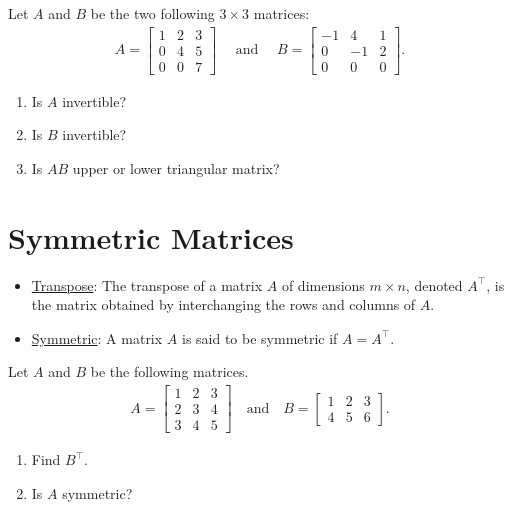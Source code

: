 \documentclass[12pt,a4paper]{article}
\newcounter{example}[section]
\begin{document}
	\begin{example}
	Let $A$ and $B$ be the two following $3 \times 3$ matrices:
		\begin{align*}
		A = \begin{bmatrix}
		1 & 2 & 3 \\
		0 & 4 & 5 \\
		0 & 0 & 7
		\end{bmatrix}
		\quad \text{ and } \quad
		B = \begin{bmatrix}
		-1 & 4 & 1 \\
		0 & -1 & 2 \\
		0 & 0 & 0 
		\end{bmatrix} .
		\end{align*}
	\begin{multicols}{3}
		\begin{enumerate}
		\item Is $A$ invertible?
		\item Is $B$ invertible?
		\item Is $AB$ upper or lower triangular matrix?
		\end{enumerate}
	\end{multicols}
	\end{example}
	
\newpage
	
\section{Symmetric Matrices}

\begin{itemize}
\item \underline{Transpose}: The transpose of a matrix $A$ of dimensions $m \times n$, denoted $A^{\top}$, is the matrix obtained by interchanging the rows and columns of $A$.
\item \underline{Symmetric}: A matrix $A$ is said to be symmetric if $A = A^{\top}$.
\end{itemize}

\begin{example}
Let $A$ and $B$ be the following matrices.
	\begin{align*}
	A = \begin{bmatrix}
	1 & 2 & 3 \\
	2 & 3 & 4 \\
	3 & 4 & 5 
	\end{bmatrix}
	\quad \text{and} \quad
	B = \begin{bmatrix}
	1 & 2 & 3 \\ 4 & 5 & 6
	\end{bmatrix} .
	\end{align*}
	\begin{enumerate}
	\item Find $B^\top$.
	\item Is $A$ symmetric?
	\end{enumerate}
\end{example}
\end{document}
